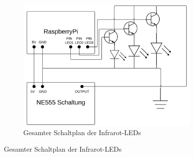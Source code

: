 \begin{figure}
	\begin{subfigure}{\textwidth}
		\includegraphics[height=.4\textheight]{images/schaltung_ne555_led.pdf}
		\caption{Gesamter Schaltplan der Infrarot-LEDs}
		\label{fig:schaltplan_ne555_leds}
	\end{subfigure}
\end{figure}

